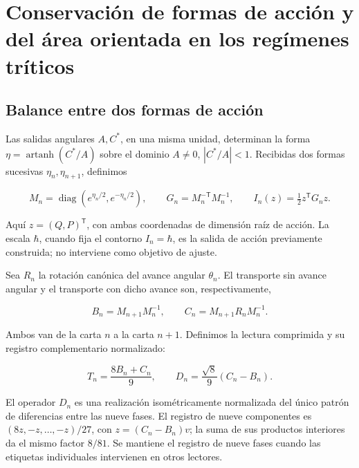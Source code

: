 \chapter{Conservación de formas de acción y del área orientada en los regímenes tríticos}
\label{x_reciprocidad:nuclear:8}
\section{Balance entre dos formas de acción}

Las salidas angulares \(A,C^*\), en una misma unidad, determinan la forma \(\eta=\operatorname{artanh}(C^*/A)\) sobre el dominio \(A\ne0\), \(|C^*/A|<1\). Recibidas dos formas sucesivas \(\eta_n,\eta_{n+1}\), definimos

\[
M_n=\operatorname{diag}(e^{\eta_n/2},e^{-\eta_n/2}),\qquad
G_n=M_n^{-\mathsf T}M_n^{-1},\qquad
I_n(z)=\tfrac12z^\mathsf TG_nz.
\]

Aquí \(z=(Q,P)^\mathsf T\), con ambas coordenadas de dimensión raíz de acción. La escala \(\hbar\), cuando fija el contorno \(I_n=\hbar\), es la salida de acción previamente construida; no interviene como objetivo de ajuste.

Sea \(R_n\) la rotación canónica del avance angular \(\theta_n\). El transporte sin avance angular y el transporte con dicho avance son, respectivamente,

\begin{equation}
B_n=M_{n+1}M_n^{-1},\qquad
C_n=M_{n+1}R_nM_n^{-1}.
\label{x_reciprocidad:nuc08:eq:1}
\end{equation}

Ambos van de la carta \(n\) a la carta \(n+1\). Definimos la lectura comprimida y su registro complementario normalizado:

\begin{equation}
T_n=\frac{8B_n+C_n}{9},\qquad
D_n=\frac{\sqrt8}{9}(C_n-B_n).
\label{x_reciprocidad:nuc08:eq:2}
\end{equation}

El operador \(D_n\) es una realización isométricamente normalizada del único patrón de diferencias entre las nueve fases. El registro de nueve componentes es \((8z,-z,\ldots,-z)/27\), con \(z=(C_n-B_n)v\); la suma de sus productos interiores da el mismo factor \(8/81\). Se mantiene el registro de nueve fases cuando las etiquetas individuales intervienen en otros lectores.

